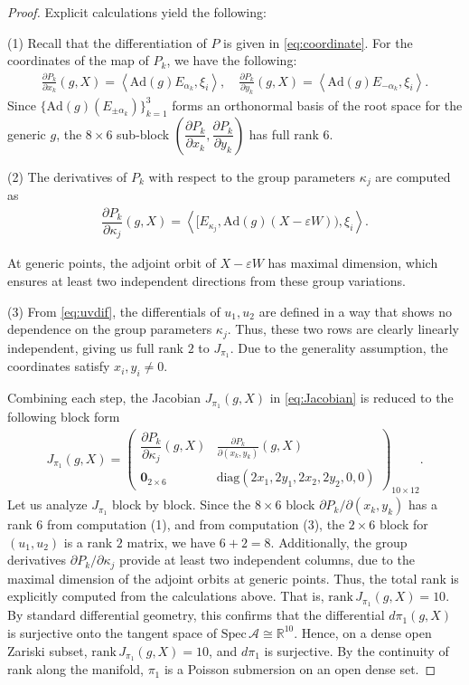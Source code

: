 \documentclass[11pt]{amsart}
\theoremstyle{definition}
\theoremstyle{plain}
\theoremstyle{conclusion}
\begin{document}
\begin{proof}
Explicit calculations yield the following:

(1) Recall that the differentiation of $P$ is given in \eqref{eq:coordinate}.  For the coordinates of the map of $P_k$, we have the following: \begin{align*}
    \frac{\partial P_k}{\partial x_k}(g,X)=\left\langle\mathrm{Ad}(g) E_{\alpha_k},\xi_i\right\rangle,\quad \frac{\partial P_k}{\partial y_k}(g,X)=\left\langle\mathrm{Ad}(g) E_{-\alpha_k},\xi_i\right\rangle.
\end{align*}  Since $\{\mathrm{Ad}(g)(E_{\pm\alpha_k})\}_{k = 1}^3$ forms an orthonormal basis of the root space for the generic $g$, the $8\times6$ sub-block $\left(\dfrac{\partial P_k}{\partial x_k},\dfrac{\partial P_k}{\partial y_k}\right)$ has full rank $6$.

(2) The derivatives of $P_k$ with respect to the group parameters $\kappa_j$ are computed as \begin{align*}
    \dfrac{\partial P_k}{\partial \kappa_j}(g,X)= \left\langle[E_{\kappa_j},\mathrm{Ad}(g)(X-\varepsilon W)),\xi_i\right\rangle .
\end{align*} 

At generic points, the adjoint orbit of $X-\varepsilon W$ has maximal dimension, which ensures at least two independent directions from these group variations.

(3) From \eqref{eq:uvdif}, the differentials of $u_1,u_2$ are defined in a way that shows no dependence on the group parameters $\kappa_j$. Thus, these two rows are clearly linearly independent, giving us full rank $2$ to $J_{\pi_1}$. Due to the generality assumption, the coordinates satisfy $x_i,y_i\neq 0$.

Combining each step, the Jacobian $J_{\pi_1}(g,X)$ in \eqref{eq:Jacobian} is reduced to the following block form \begin{align*}
    J_{\pi_1}(g,X)=
\begin{pmatrix}
\dfrac{\partial P_k}{\partial \kappa_j}(g,X)&\frac{\partial P_k}{\partial(x_k,y_k)}(g,X)\\[6pt]
\textbf{0}_{2\times6}&\mathrm{diag}(2x_1,2y_1,2x_2,2y_2,0,0)
\end{pmatrix}_{10\times12}.
\end{align*} Let us analyze $J_{\pi_1}$ block by block. Since the $8\times6$ block $\partial P_k/\partial(x_k,y_k)$ has a rank $6$ from computation (1), and from computation (3), the $2\times6$ block for $(u_1,u_2)$ is a rank $2$ matrix, we have $6+2=8$. Additionally, the group derivatives $\partial P_k/\partial\kappa_j$ provide at least two independent columns, due to the maximal dimension of the adjoint orbits at generic points. Thus, the total rank is explicitly computed from the calculations above. That is, $
\mathrm{rank}\, J_{\pi_1}(g,X)=10 $. By standard differential geometry, this confirms that the differential $d\pi_1(g,X)$ is surjective onto the tangent space of $\mathrm{Spec}\,\mathcal{A}\cong\mathbb{R}^{10}$. Hence, on a dense open Zariski subset, $\mathrm{rank} \, J_{\pi_1}(g,X) = 10$, and $d\pi_1$ is surjective. By the continuity of rank along the manifold, $\pi_1$ is a Poisson submersion on an open dense set.


\end{proof}
\end{document}
